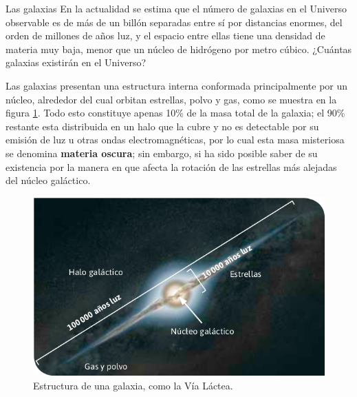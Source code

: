 \documentclass[12pt,addpoints]{guia}
\begin{document}
\begin{sectionbox}{Las galaxias}
    En la actualidad se estima que el número de galaxias en el Universo observable es de más de un \label{085a_d}billón separadas entre sí por distancias enormes, del
    orden de millones de años luz, y el espacio entre ellas tiene una densidad
    de materia muy baja, menor que un núcleo de hidrógeno por metro cúbico.
    ¿Cuántas galaxias existirán en el Universo?

    Las galaxias presentan una estructura interna conformada principalmente por un núcleo,
    alrededor del cual orbitan estrellas, polvo y
    gas, como se muestra en la figura \ref{fig:20230521214652}. \label{085a_e} Todo esto constituye apenas 10\% de la
    masa total de la galaxia; \label{085a_f} el 90\% restante esta
    distribuida en un halo que la cubre y no es detectable por su emisión de luz u otras ondas
    electromagnéticas, por lo cual esta masa misteriosa se denomina \textbf{materia oscura}; sin embargo, si ha sido posible saber de su existencia
    por la manera en que afecta la rotación de las
    estrellas más alejadas del núcleo galáctico.

    \begin{figure}[H]
        \centering
        \includegraphics[width=0.65\linewidth]{../images/20230521214652}
        \caption{Estructura de una galaxia, como la Vía Láctea.}
        \label{fig:20230521214652}
    \end{figure}

\end{sectionbox}
\end{document}
